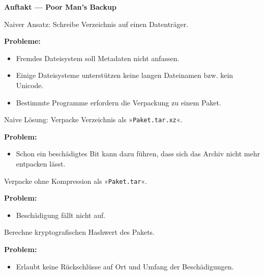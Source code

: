 \documentclass[9pt]{beamer}
\newcommand{\strong}[1]{\textsf{\textbf{#1}}}
\begin{document}
\begin{frame}
\begin{center}
\strong{Auftakt --- Poor Man's Backup}
\end{center}
\end{frame}

\begin{frame}
Naiver Ansatz: Schreibe Verzeichnis auf einen Datenträger.\pause

\vspace{1em}
\strong{Probleme:}
\begin{itemize}
\item Fremdes Dateisystem soll Metadaten nicht anfassen.
\item Einige Dateisysteme unterstützen keine langen Dateinamen
  bzw. kein Unicode.
\item Bestimmte Programme erfordern die Verpackung zu einem Paket.
\end{itemize}
\end{frame}

\begin{frame}
Naive Lösung: Verpacke Verzeichnis als »\texttt{Paket.tar.xz}«.\pause

\vspace{2em}
\strong{Problem:}
\begin{itemize}
\item Schon ein beschädigtes Bit kann dazu führen, dass sich
  das Archiv nicht mehr entpacken lässt.
\end{itemize}
\end{frame}

\begin{frame}
Verpacke ohne Kompression als »\texttt{Paket.tar}«.\pause

\vspace{2em}
\strong{Problem:}
\begin{itemize}
\item Beschädigung fällt nicht auf.
\end{itemize}
\end{frame}

\begin{frame}
Berechne kryptografischen Hashwert des Pakets.\pause

\vspace{2em}
\strong{Problem:}
\begin{itemize}
\item Erlaubt keine Rückschlüsse auf Ort und Umfang der
  Beschädigungen.
\end{itemize}
\end{frame}
\end{document}
